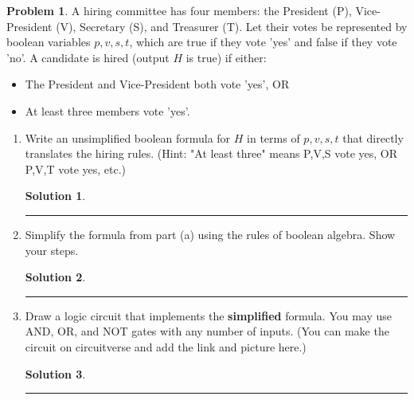 \documentclass{article}
\theoremstyle{definition}
\newtheorem{problem}{Problem}
\def\fline{\rule{0.75\linewidth}{0.5pt}}
\newcommand{\finishline}{\begin{center}\fline\end{center}}
\newtheorem*{solution*}{Solution}
\newenvironment{solution}{\begin{solution*}}{{\finishline} \end{solution*}}
\begin{document}
    \begin{problem}
    A hiring committee has four members: the President (P), Vice-President (V), Secretary (S), and Treasurer (T). Let their votes be represented by boolean variables $p, v, s, t$, which are true if they vote 'yes' and false if they vote 'no'. A candidate is hired (output $H$ is true) if either:
    \begin{itemize}
        \item The President and Vice-President both vote 'yes', OR
        \item At least three members vote 'yes'.
    \end{itemize}
    \begin{enumerate}[label=(\alph*)]
        \item Write an unsimplified boolean formula for $H$ in terms of $p, v, s, t$ that directly translates the hiring rules. (Hint: "At least three" means P,V,S vote yes, OR P,V,T vote yes, etc.)

        \begin{solution}



        \end{solution}
        \item Simplify the formula from part (a) using the rules of boolean algebra. Show your steps.

        \begin{solution}



        \end{solution}
        \item Draw a logic circuit that implements the \textbf{simplified} formula. You may use AND, OR, and NOT gates with any number of inputs. (You can make the circuit on circuitverse and add the link and picture here.)

        \begin{solution}



        \end{solution}
    \end{enumerate}
\end{problem}
\end{document}
